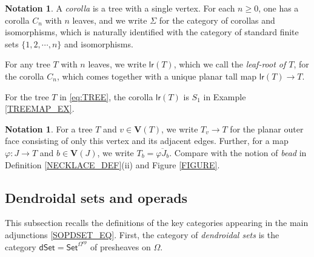 \documentclass{hha}
\theoremstyle{definition} %
\newtheorem{notation}[theorem]{Notation}%
\newcommand{\Set}{\mathsf{Set}}
\newcommand{\dSet}{\mathsf{dSet}}
\begin{document}
\begin{notation}\label{LEAFROOT NOT}
	A \textit{corolla} is a tree with a single vertex.
	For each $n\geq 0$, one has a corolla $C_n$ with $n$ leaves,
	and we write $\Sigma$ for the category of corollas and isomorphisms, which is naturally identified with the category of standard finite sets
	$\{1,2,\cdots,n\}$ and isomorphisms.
	
	For any tree $T$ with $n$ leaves, 
	we write $\mathsf{lr}(T)$,
	which we call the \emph{leaf-root of $T$},
	for the corolla $C_n$,
	which comes together with a unique planar tall map
	$\mathsf{lr}(T) \to T$.
\end{notation}

\begin{example}
	For the tree $T$ in \eqref{eq:TREE},
	the corolla $\mathsf{lr}(T)$ is $S_1$
	in Example \ref{TREEMAP_EX}.
\end{example}



\begin{notation}\label{TV_NOT}
	For a tree $T$ and $v \in \boldsymbol{V}(T)$,
	we write $T_v \to T$ for the planar outer face consisting of only this vertex and its adjacent edges.
	Further, for a map 
	$\varphi \colon J\to T$ and $b \in \boldsymbol{V}(J)$,
	we write
	$T_b = \overline{\varphi J_b}$.
	Compare with the notion of \emph{bead}
	in Definition \ref{NECKLACE_DEF}(ii)
	and Figure \ref{FIGURE}.
\end{notation}



\subsection{Dendroidal sets and operads}
\label{DSETSOPS SEC}


This subsection recalls the definitions
of the key categories appearing in the main adjunctions \eqref{SOPDSET_EQ}.
First, the category of 
\emph{dendroidal sets}
is the category $\dSet = \Set^{\Omega^{op}}$
of presheaves on $\Omega$.
\end{document}
